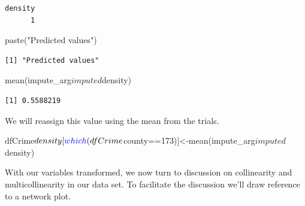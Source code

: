 \documentclass[]{article}
\newenvironment{Shaded}{}{}
\newcommand{\DecValTok}[1]{#1}
\newcommand{\KeywordTok}[1]{\textcolor[rgb]{0.00,0.00,1.00}{#1}}
\newcommand{\NormalTok}[1]{#1}
\newcommand{\OperatorTok}[1]{#1}
\newcommand{\StringTok}[1]{\textcolor[rgb]{0.00,0.50,0.50}{#1}}
\begin{document}
\begin{verbatim}
density 
      1 
\end{verbatim}

\begin{Shaded}
\begin{Highlighting}[]
\KeywordTok{paste}\NormalTok{(}\StringTok{"Predicted values"}\NormalTok{)}
\end{Highlighting}
\end{Shaded}

\begin{verbatim}
[1] "Predicted values"
\end{verbatim}

\begin{Shaded}
\begin{Highlighting}[]
\KeywordTok{mean}\NormalTok{(impute_arg}\OperatorTok{$}\NormalTok{imputed}\OperatorTok{$}\NormalTok{density)}
\end{Highlighting}
\end{Shaded}

\begin{verbatim}
[1] 0.5588219
\end{verbatim}

We will reassign this value using the mean from the trials.

\begin{Shaded}
\begin{Highlighting}[]
\NormalTok{dfCrime}\OperatorTok{$}\NormalTok{density[}\KeywordTok{which}\NormalTok{(dfCrime}\OperatorTok{$}\NormalTok{county}\OperatorTok{==}\DecValTok{173}\NormalTok{)]<-}\KeywordTok{mean}\NormalTok{(impute_arg}\OperatorTok{$}\NormalTok{imputed}\OperatorTok{$}\NormalTok{density)}
\end{Highlighting}
\end{Shaded}

With our variables transformed, we now turn to discussion on
collinearity and multicollinearity in our data set. To facilitate the
discussion we'll draw reference to a network plot.
\end{document}
